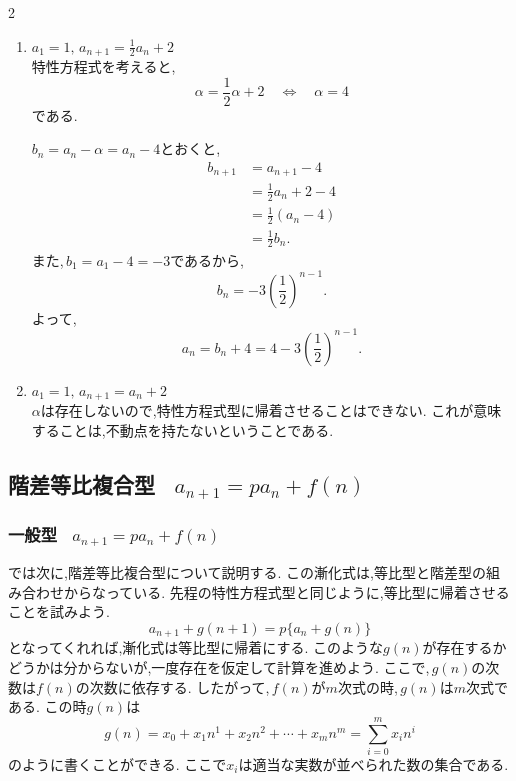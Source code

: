 \documentclass[dvipdfmx,a4paper,11pt,fleqn,openany]{jsbook}
\begin{document}
\begin{multicols*}{2}
\begin{enumerate}[label=(\arabic*),parsep=3pt]
          $b_n=a_n-\alpha=a_n+1$とおくと,
          \begin{align*}
            b_{n+1}
              &=a_{n+1}+1\\
              &=2a_n+2\\
              &=2(a_n+1)\\
              &=2b_n.
          \end{align*}
          また,\,$b_1=a_1+1=2$であるから,
          \[
            b_n=2^n.
          \]
          よって,
          \[
            a_n=b_n-1=2^n-1.
          \]

    \item $\displaystyle a_1=1,\,a_{n+1}=\frac12a_n+2$\\
            特性方程式を考えると,
            \[
              \alpha=\frac12\alpha+2
              \quad\Longleftrightarrow\quad
              \alpha=4
            \]
            である.

            $b_n=a_n-\alpha=a_n-4$とおくと,
            \begin{align*}
              b_{n+1}
                &=a_{n+1}-4\\
                &=\frac12a_n+2-4\\
                &=\frac12(a_n-4)\\
                &=\frac12b_n.
            \end{align*}
            また,\,$b_1=a_1-4=-3$であるから,
            \[
              b_n=-3\left(\frac12\right)^{n-1}.
            \]
            よって,
            \[
              a_n=b_n+4
              =4-3\left(\frac12\right)^{n-1}.
            \]
     \item $\displaystyle a_1=1,\, a_{n+1}=a_n+2$\\
           $\alpha$は存在しないので,特性方程式型に帰着させることはできない.
           これが意味することは,不動点を持たないということである.
  \end{enumerate}

  \subsection{階差等比複合型 \, $\displaystyle a_{n+1}=pa_n+f(n)$}
    \subsubsection{一般型 \, $\displaystyle a_{n+1}=pa_n+f(n)$}
      では次に,階差等比複合型について説明する.
      この漸化式は,等比型と階差型の組み合わせからなっている.
      先程の特性方程式型と同じように,等比型に帰着させることを試みよう.
      \[
        a_{n+1}+g(n+1)=p\{a_n+g(n)\}
      \]
      となってくれれば,漸化式は等比型に帰着にする.
      このような$g(n)$が存在するかどうかは分からないが,一度存在を仮定して計算を進めよう.
      ここで,\,$g(n)$の次数は$f(n)$の次数に依存する.
      したがって,\,$f(n)$が$m$次式の時,\,$g(n)$は$m$次式である.
      この時$g(n)$は
      \[
        g(n) = x_0 + x_1 n^1 + x_2 n^2  + \cdots +x_{m} n^m =\sum_{i=0}^{m} x_i n^{i}
      \]
      のように書くことができる.
      ここで$x_i$は適当な実数が並べられた数の集合である.


\end{multicols*}
\end{document}
